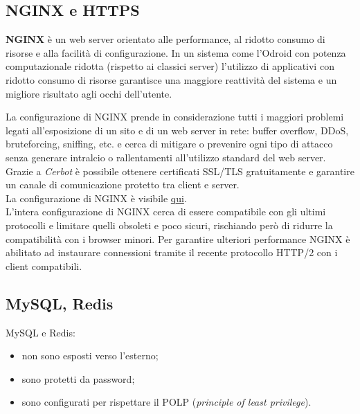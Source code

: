 \subsection{NGINX e HTTPS}
\textbf{NGINX} è un web server orientato alle performance, al ridotto consumo di risorse e alla facilità di configurazione.
In un sistema come l'Odroid con potenza computazionale ridotta (rispetto ai classici server) l'utilizzo di applicativi con ridotto consumo di risorse garantisce una maggiore reattività del sistema e un migliore risultato agli occhi dell'utente.

La configurazione di NGINX prende in considerazione tutti i maggiori problemi legati all'esposizione di un sito e di un web server in rete: buffer overflow, DDoS, bruteforcing, sniffing, etc. e cerca di mitigare o prevenire ogni tipo di attacco senza generare intralcio o rallentamenti all'utilizzo standard del web server.\\
Grazie a \textit{Cerbot} è possibile ottenere certificati SSL/TLS gratuitamente e garantire un canale di comunicazione protetto tra client e server.\\
La configurazione di NGINX è visibile \href{https://raw.githubusercontent.com/FedericoTorsello/Embedded/serverPHP/nginx.conf}{qui}.\\
L'intera configurazione di NGINX cerca di essere compatibile con gli ultimi protocolli e limitare quelli obsoleti e poco sicuri, rischiando però di ridurre la compatibilità con i browser minori. Per garantire ulteriori performance NGINX è abilitato ad instaurare connessioni tramite il recente protocollo HTTP/2 con i client compatibili.

\subsection{MySQL, Redis}
MySQL e Redis:
\begin{itemize}
	\item non sono esposti verso l'esterno;
	\item sono protetti da password;
	\item sono configurati per rispettare il POLP (\textit{principle of least privilege}).
\end{itemize}
